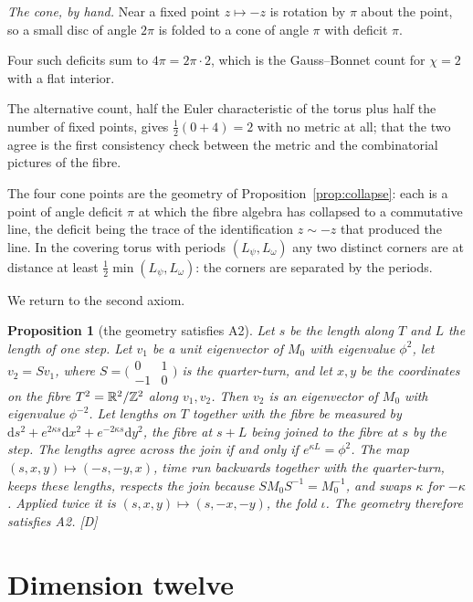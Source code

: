 \documentclass[11pt,a4paper]{article}
\theoremstyle{plain}
\newtheorem{proposition}[theorem]{Proposition}
\theoremstyle{definition}
\theoremstyle{remark}
\newcommand{\rigD}{[\textup{D}]}
\begin{document}
\emph{The cone, by hand.} Near a fixed point $z\mapsto-z$ is rotation by $\pi$ about the point, so a small disc of angle $2\pi$ is folded to a cone of angle $\pi$ with deficit $\pi$.

Four such deficits sum to $4\pi=2\pi\cdot2$, which is the Gauss--Bonnet count for $\chi=2$ with a flat interior.

The alternative count, half the Euler characteristic of the torus plus half the number of fixed points, gives $\tfrac12(0+4)=2$ with no metric at all; that the two agree is the first consistency check between the metric and the combinatorial pictures of the fibre.

The four cone points are the geometry of Proposition~\ref{prop:collapse}: each is a point of angle deficit $\pi$ at which the fibre algebra has collapsed to a commutative line, the deficit being the trace of the identification $z\sim-z$ that produced the line. In the covering torus with periods $(L_{\psi},L_{\omega})$ any two distinct corners are at distance at least $\tfrac12\min(L_{\psi},L_{\omega})$: the corners are separated by the periods.

We return to the second axiom.

\begin{proposition}[the geometry satisfies A2]\label{prop:A2}
Let $s$ be the length along $T$ and $L$ the length of one step. Let $v_{1}$ be a unit eigenvector of $M_{0}$ with eigenvalue $\phi^{2}$, let $v_{2}=Sv_{1}$, where $S=\bigl(\begin{smallmatrix}0&1\\-1&0\end{smallmatrix}\bigr)$ is the quarter-turn, and let $x,y$ be the coordinates on the fibre $T^2=\mathbb{R}^{2}/\mathbb{Z}^{2}$ along $v_{1},v_{2}$. Then $v_{2}$ is an eigenvector of $M_{0}$ with eigenvalue $\phi^{-2}$. Let lengths on $T$ together with the fibre be measured by $\mathrm{d}s^{2}+e^{2\kappa s}\mathrm{d}x^{2}+e^{-2\kappa s}\mathrm{d}y^{2}$, the fibre at $s+L$ being joined to the fibre at $s$ by the step. The lengths agree across the join if and only if $e^{\kappa L}=\phi^{2}$. The map $(s,x,y)\mapsto(-s,-y,x)$, time run backwards together with the quarter-turn, keeps these lengths, respects the join because $SM_{0}S^{-1}=M_{0}^{-1}$, and swaps $\kappa$ for $-\kappa$. Applied twice it is $(s,x,y)\mapsto(s,-x,-y)$, the fold $\iota$. The geometry therefore satisfies A2. \rigD
\end{proposition}

\section{Dimension twelve}\label{sec:dimension}
\end{document}
